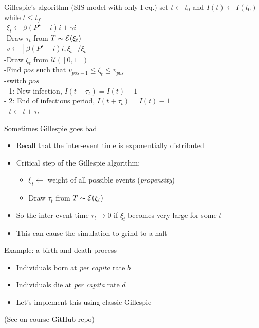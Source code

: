 \documentclass[aspectratio=169]{beamer}
\begin{document}
\begin{frame}{Gillespie's algorithm (SIS model with only I eq.)}
set $t\leftarrow t_0$ and $I(t)\leftarrow I(t_0)$\\
while {$t\leq t_f$}\\
-\qquad $\xi_t\leftarrow \beta (P^\star-i)i+\gamma i$\\
-\qquad Draw $\tau_t$ from $T\thicksim \mathcal{E}(\xi_t)$\\
-\qquad $v\leftarrow\left[\beta (P^\star-i)i,\xi_t\right]/\xi_t$\\
-\qquad Draw $\zeta_t$ from $\mathcal{U}([0,1])$\\
-\qquad Find $pos$ such that $v_{pos-1}\leq\zeta_t\leq v_{pos}$\\
-\qquad switch {$pos$}\\
\qquad\qquad - 1: New infection, $I(t+\tau_t)=I(t)+1$ \\
\qquad\qquad - 2: End of infectious period, $I(t+\tau_t)=I(t)-1$ \\
- $t\leftarrow t+\tau_t$
\end{frame}


\begin{frame}{Sometimes Gillespie goes bad}
    \begin{itemize}
        \item Recall that the inter-event time is exponentially distributed
        \item Critical step of the Gillespie algorithm:
        \begin{itemize}
            \item $\xi_t\leftarrow$ weight of all possible events (\emph{propensity})
            \item Draw $\tau_t$ from $T\thicksim \mathcal{E}(\xi_t)$
        \end{itemize}
        \item So the inter-event time $\tau_t\to 0$ if $\xi_t$ becomes very large for some $t$
        \item This can cause the simulation to grind to a halt
    \end{itemize}
\end{frame}


\begin{frame}{Example: a birth and death process}
    \begin{itemize}
        \item Individuals born at \emph{per capita} rate $b$
        \item Individuals die at \emph{per capita} rate $d$
        \item Let's implement this using classic Gillespie
    \end{itemize}
    \vfill
(See \href{https://raw.githubusercontent.com/julien-arino/3MC-course-epidemiological-modelling/main/CODE/simulate_birth_death_CTMC.R}{} on course GitHub repo)
\end{frame}
\end{document}
